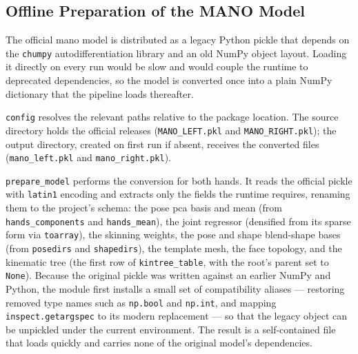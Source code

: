 \subsection{Offline Preparation of the MANO Model}\label{subsec:model_prep}

The official \acrshort{mano} model is distributed as a legacy Python pickle that
depends on the \texttt{chumpy} autodifferentiation library and an old NumPy
object layout. Loading it directly on every run would be slow and would couple the
runtime to deprecated dependencies, so the model is converted once into a plain
NumPy dictionary that the pipeline loads thereafter.

\texttt{config} resolves the relevant paths relative to the package location. The
source directory holds the official releases (\texttt{MANO\_LEFT.pkl} and
\texttt{MANO\_RIGHT.pkl}); the output directory, created on first run if absent,
receives the converted files (\texttt{mano\_left.pkl} and \texttt{mano\_right.pkl}).

\texttt{prepare\_model} performs the conversion for both hands. It reads the
official pickle with \texttt{latin1} encoding and extracts only the fields the
runtime requires, renaming them to the project's schema: the pose
\acrshort{pca} basis and mean (from \texttt{hands\_components} and
\texttt{hands\_mean}), the joint regressor (densified from its sparse form via
\texttt{toarray}), the skinning weights, the pose and shape blend-shape bases
(from \texttt{posedirs} and \texttt{shapedirs}), the template mesh, the face
topology, and the kinematic tree (the first row of \texttt{kintree\_table}, with
the root's parent set to \texttt{None}). Because the original pickle was written
against an earlier NumPy and Python, the module first installs a small set of
compatibility aliases --- restoring removed type names such as \texttt{np.bool}
and \texttt{np.int}, and mapping \texttt{inspect.getargspec} to its modern
replacement --- so that the legacy object can be unpickled under the current
environment. The result is a self-contained file that loads quickly and carries
none of the original model's dependencies.
